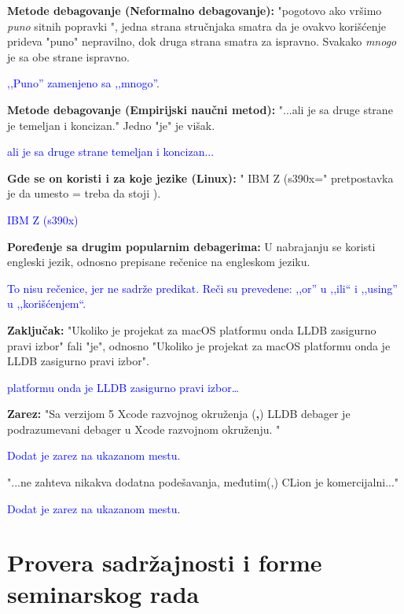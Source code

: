 \documentclass[a4paper]{report}
\newcommand{\odgovor}[1]{\textcolor{blue}{#1}}
\begin{document}
\textbf{Metode debagovanje (Neformalno debagovanje):} "pogotovo ako vršimo \textit{puno} sitnih popravki ", jedna strana stručnjaka smatra da je ovakvo korišćenje prideva
"puno" nepravilno, dok druga strana smatra za ispravno. Svakako \textit{mnogo} je sa obe strane ispravno.

\odgovor{,,Puno'' zamenjeno sa ,,mnogo''.}

\textbf{Metode debagovanje (Empirijski naučni metod):} "...ali je sa druge strane je temeljan i koncizan." Jedno "je"{} je višak.

\odgovor{ali je sa druge strane temeljan i koncizan...}

\textbf{Gde se on koristi i za koje jezike (Linux):} " IBM Z (s390x="{} pretpostavka je da umesto = treba da stoji ).

\odgovor{IBM Z (s390x)}

\textbf{Poređenje sa drugim popularnim debagerima: } U nabrajanju se koristi engleski jezik, odnosno prepisane rečenice na engleskom jeziku.

\odgovor{To nisu rečenice, jer ne sadrže predikat. Reči su prevedene: ,,or'' u ,,ili`` i ,,using'' u ,,korišćenjem``.}

\textbf{Zaključak: } "Ukoliko je projekat za macOS platformu onda LLDB zasigurno pravi izbor"{} fali "je", odnosno "Ukoliko je projekat za macOS platformu onda je LLDB zasigurno pravi izbor".

\odgovor{platformu onda je LLDB zasigurno pravi izbor\ldots}

\textbf{Zarez: } "{}Sa verzijom 5 Xcode razvojnog okruženja (\textbf{,}) LLDB debager je podrazumevani debager u Xcode razvojnom okruženju. "

\odgovor{Dodat je zarez na ukazanom mestu.}

"...ne zahteva nikakva dodatna podešavanja, međutim(,) CLion je komercijalni..."

\odgovor{Dodat je zarez na ukazanom mestu.}
\section{Provera sadržajnosti i forme seminarskog rada}
\end{document}
